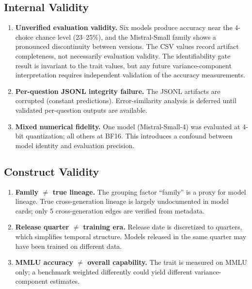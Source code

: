 \documentclass{ieeeaccess}
\theoremstyle{definition}
\theoremstyle{plain}
\begin{document}
\subsection{Internal Validity}
\begin{enumerate}
\item \textbf{Unverified evaluation validity.} Six models produce accuracy near the 4-choice chance level (23--25\%), and the Mistral-Small family shows a pronounced discontinuity between versions. The CSV values record artifact completeness, not necessarily evaluation validity. The identifiability gate result is invariant to the trait values, but any future variance-component interpretation requires independent validation of the accuracy measurements.
\item \textbf{Per-question JSONL integrity failure.} The JSONL artifacts are corrupted (constant predictions). Error-similarity analysis is deferred until validated per-question outputs are available.
\item \textbf{Mixed numerical fidelity.} One model (Mistral-Small-4) was evaluated at 4-bit quantization; all others at BF16. This introduces a confound between model identity and evaluation precision.
\end{enumerate}

\subsection{Construct Validity}
\begin{enumerate}
\item \textbf{Family $\neq$ true lineage.} The grouping factor ``family'' is a proxy for model lineage. True cross-generation lineage is largely undocumented in model cards; only 5 cross-generation edges are verified from metadata.
\item \textbf{Release quarter $\neq$ training era.} Release date is discretized to quarters, which simplifies temporal structure. Models released in the same quarter may have been trained on different data.
\item \textbf{MMLU accuracy $\neq$ overall capability.} The trait is measured on MMLU only; a benchmark weighted differently could yield different variance-component estimates.
\end{enumerate}
\end{document}
